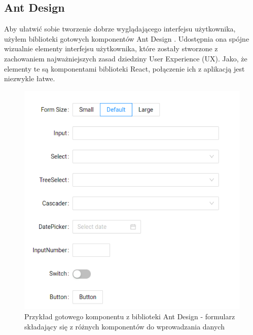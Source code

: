 \documentclass[shortabstract,inz]{iithesis}
\begin{document}
\subsection{Ant Design}
Aby ułatwić sobie tworzenie dobrze wyglądającego interfejsu użytkownika, użyłem biblioteki gotowych komponentów Ant Design \citep{ant-design}. Udostępnia ona spójne wizualnie elementy interfejsu użytkownika, które zostały stworzone z zachowaniem najważniejszych zasad dziedziny User Experience (UX). Jako, że elementy te są komponentami biblioteki React, połączenie ich z aplikacją jest niezwykle łatwe.
\begin{figure}
	\centering
	\includegraphics[scale=0.7]{screen-ant-design-form.png}
	\caption{Przykład gotowego komponentu z biblioteki Ant Design - formularz składający się z różnych komponentów do wprowadzania danych}
	\label{fig:ant-design-example}
\end{figure}
\end{document}
